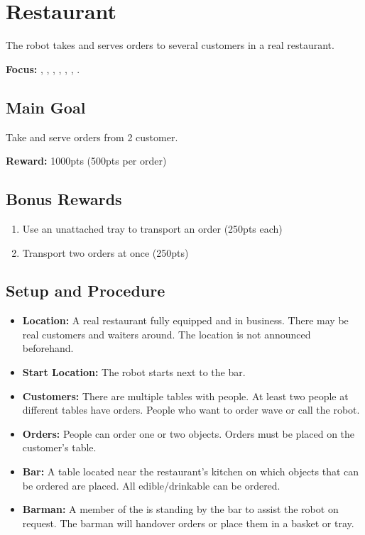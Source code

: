 \section{Restaurant}
\label{test:restaurant}
The robot takes and serves orders to several customers in a real restaurant.

\noindent \textbf{Focus:} \SysI{}, \NAV{}, \MAP{}, \HRI{}, \MAN{}, \PerDet{}, \OR{}.

\subsection*{Main Goal}
Take and serve orders from 2 customer.

\noindent\textbf{Reward:} 1000pts (500pts per order)

\subsection*{Bonus Rewards}
\begin{enumerate}[nosep]
	\item Use an unattached tray to transport an order (250pts each)
	\item Transport two orders at once (250pts)
\end{enumerate}

\subsection*{Setup and Procedure}
\begin{itemize}[nosep]
	\item \textbf{Location:} A real restaurant fully equipped and in business. There may be real customers and waiters around. The location is not announced beforehand.

	\item \textbf{Start Location:} The robot starts next to the bar.

	\item \textbf{Customers:} There are multiple tables with people. At least two people at different tables have orders. People who want to order wave or call the robot.
	
	\item \textbf{Orders:} People can order one or two objects. Orders must be placed on the customer's table.

    \item \textbf{Bar:} A table located near the restaurant's kitchen on which objects that can be ordered are placed. All edible/drinkable \KnownObjects{} can be ordered.

	\item \textbf{Barman:} A member of the  is standing by the bar to assist the robot on request. The barman will handover orders or place them in a basket or tray.
\end{itemize}

